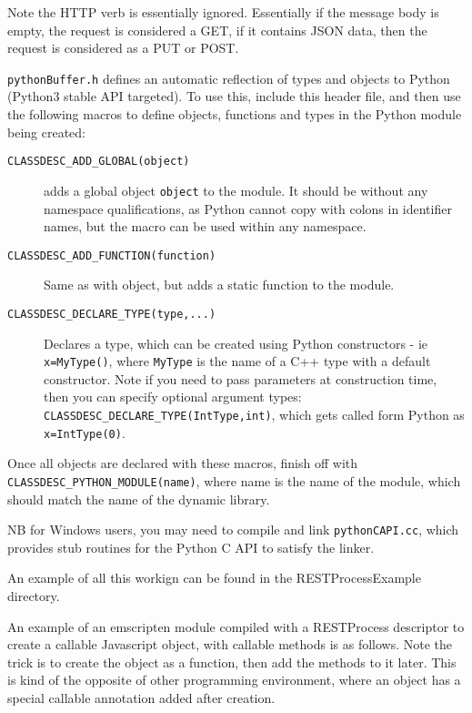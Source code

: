 Note the HTTP verb is essentially ignored. Essentially if the message body is
empty, the request is considered a GET, if it contains JSON data, then
the request is considered as a PUT or POST.


\verb+pythonBuffer.h+ defines an automatic reflection of types and
objects to Python (Python3 stable API targeted). To use this, include
this header file, and then use the following macros to define objects,
functions and types in the Python module being created:

\begin{description}
\item[{\tt CLASSDESC\_ADD\_GLOBAL(object)}]
adds a global object \verb+object+ to the module. It should be without any namespace
qualifications, as Python cannot copy with colons in identifier names,
but the macro can be used within any namespace.
\item[{\tt CLASSDESC\_ADD\_FUNCTION(function)}] Same as with object, but adds
  a static function to the module.
\item[{\tt CLASSDESC\_DECLARE\_TYPE(type,...)}] Declares a type, which can be
  created using Python constructors - ie \verb+x=MyType()+, where
  \verb+MyType+ is the name of a C++ type with a default constructor.
  Note if you need to pass parameters at construction time, then you
  can specify optional argument types:
  \verb+CLASSDESC_DECLARE_TYPE(IntType,int)+, which gets called form
  Python as \verb+x=IntType(0)+.
\end{description}

Once all objects are declared with these macros, finish off with
\verb+CLASSDESC_PYTHON_MODULE(name)+, where name is the name of the
module, which should match the name of the dynamic library.

NB for Windows users, you may need to compile and link
\verb+pythonCAPI.cc+, which provides stub routines for the Python C
API to satisfy the linker.

An example of all this workign can be found in the RESTProcessExample directory.


An example of an emscripten module compiled with a RESTProcess
descriptor to create a callable Javascript object, with callable
methods is as follows. Note the trick is to create the object as a
function, then add the methods to it later. This is kind of the
opposite of other programming environment, where an object has a
special callable annotation added after creation.

